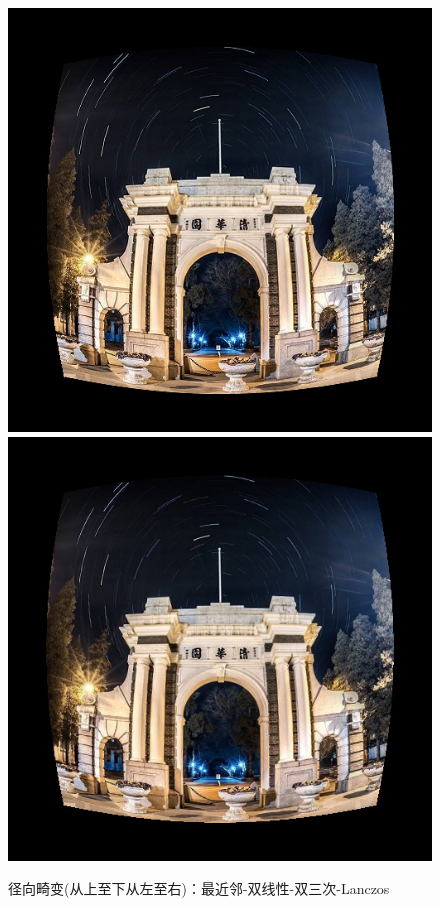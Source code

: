 \documentclass[UTF8]{ctexart}
\begin{document}
\begin{figure}[H]
    \includegraphics[scale=0.3]{../images/report-images/radical_distortionbicub.png}
    \includegraphics[scale=0.3]{../images/report-images/radical_distortionLanczos.png}
    \caption{径向畸变(从上至下从左至右)：最近邻-双线性-双三次-Lanczos}
\end{figure}
\end{document}
